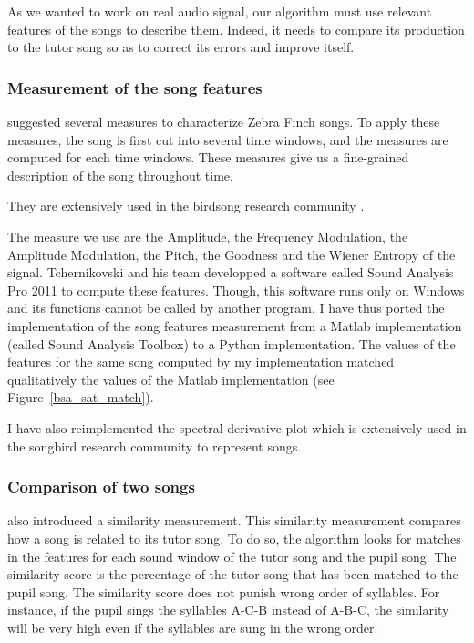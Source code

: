 \documentclass{report}
\begin{document}
As we wanted to work on real audio signal, our algorithm must use relevant
features of the songs to describe them. Indeed, it needs to compare its
production to the tutor song so as to correct its errors and improve itself.

\subsubsection{Measurement of the song features} \label{measures}

\textcite{tchernichovski_procedure_2000} suggested several measures to
characterize Zebra Finch songs. To apply these measures, the song is first cut
into several time windows, and the measures are computed for each time windows.
These measures give us a fine-grained description of the song throughout time.

They are extensively used in the birdsong research community
\parencite{coen_learning_2007, deregnaucourt_how_2005, lipkind_stepwise_2013,
liu_juvenile_2004}.

The measure we use are the Amplitude, the Frequency Modulation, the Amplitude
Modulation, the Pitch, the Goodness and the Wiener Entropy of the signal.
Tchernikovski and his team developped a software called Sound Analysis Pro 2011
to compute these features. Though, this software runs only on Windows and its
functions cannot be called by another program. I have thus ported the
implementation of the song features measurement from a Matlab implementation
(called Sound Analysis Toolbox) to a Python implementation. The values of the
features for the same song computed by my implementation matched qualitatively
the values of the Matlab implementation (see Figure~\ref{bsa_sat_match}).

I have also reimplemented the spectral derivative plot which is
extensively used in the songbird research community to represent songs.


\subsubsection{Comparison of two songs}

\textcite{tchernichovski_procedure_2000} also introduced a similarity
measurement. This similarity measurement compares how a song is related to its
tutor song. To do so, the algorithm looks for matches in the features for each
sound window of the tutor song and the pupil song. The similarity score is the
percentage of the tutor song that has been matched to the pupil song. The
similarity score does not punish wrong order of syllables. For instance, if the
pupil sings the syllables A-C-B instead of A-B-C, the similarity will be very
high even if the syllables are sung in the wrong order.
\end{document}

